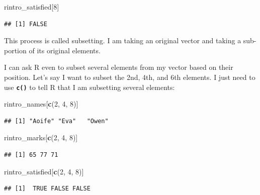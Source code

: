 \documentclass[
]{book}
\newenvironment{Shaded}{\begin{snugshade}}{\end{snugshade}}
\newcommand{\DecValTok}[1]{\textcolor[rgb]{0.00,0.00,0.81}{#1}}
\newcommand{\FunctionTok}[1]{\textcolor[rgb]{0.13,0.29,0.53}{\textbf{#1}}}
\newcommand{\NormalTok}[1]{#1}
\begin{document}
\begin{Shaded}
\begin{Highlighting}[]
\NormalTok{rintro\_satisfied[}\DecValTok{8}\NormalTok{]}
\end{Highlighting}
\end{Shaded}

\begin{verbatim}
## [1] FALSE
\end{verbatim}

This process is called subsetting. I am taking an original vector and taking a sub-portion of its original elements.

I can ask R even to subset several elements from my vector based on their position. Let's say I want to subset the 2nd, 4th, and 6th elements. I just need to use \textbf{\texttt{c()}} to tell R that I am subsetting several elements:

\begin{Shaded}
\begin{Highlighting}[]
\NormalTok{rintro\_names[}\FunctionTok{c}\NormalTok{(}\DecValTok{2}\NormalTok{, }\DecValTok{4}\NormalTok{, }\DecValTok{8}\NormalTok{)]}
\end{Highlighting}
\end{Shaded}

\begin{verbatim}
## [1] "Aoife" "Eva"   "Owen"
\end{verbatim}

\begin{Shaded}
\begin{Highlighting}[]
\NormalTok{rintro\_marks[}\FunctionTok{c}\NormalTok{(}\DecValTok{2}\NormalTok{, }\DecValTok{4}\NormalTok{, }\DecValTok{8}\NormalTok{)]}
\end{Highlighting}
\end{Shaded}

\begin{verbatim}
## [1] 65 77 71
\end{verbatim}

\begin{Shaded}
\begin{Highlighting}[]
\NormalTok{rintro\_satisfied[}\FunctionTok{c}\NormalTok{(}\DecValTok{2}\NormalTok{, }\DecValTok{4}\NormalTok{, }\DecValTok{8}\NormalTok{)]}
\end{Highlighting}
\end{Shaded}

\begin{verbatim}
## [1]  TRUE FALSE FALSE
\end{verbatim}
\end{document}
